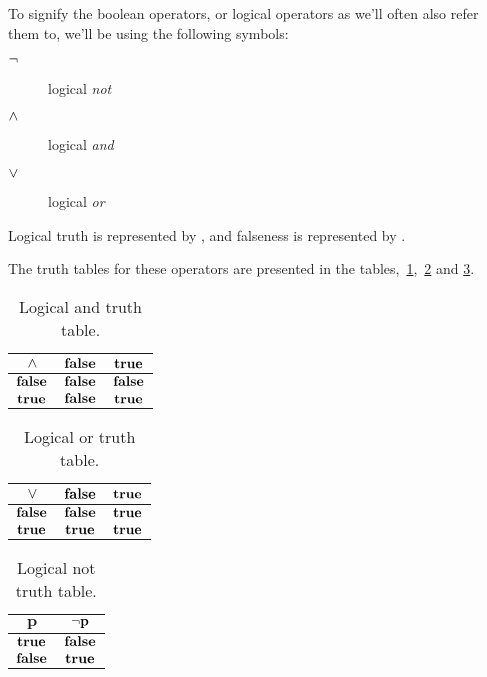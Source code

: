 To signify the boolean operators, or logical operators as we'll often
also refer them to, we'll be using the following symbols:

\begin{description}
\item[$\neg$] logical \textit{not}
\item[$\wedge$] logical \textit{and}
\item[$\vee$] logical \textit{or}
\end{description}

Logical truth is represented by \True, and falseness is represented by
\False.

The truth tables for these operators are presented in the
tables,~\ref{tab:log-and-table},~\ref{tab:log-or-table} and
\ref{tab:log-not-table}.

\begin{table}
  \centering
  \begin{tabular}{|c|c|c|}
    \hline
    $\mathbf{\wedge}$ & $\mathbf{\textbf{false}}$ & $\mathbf{\textbf{true}}$ \\ \hline
    $\mathbf{\textbf{false}}$ & $\mathbf{\textbf{false}}$ & $\mathbf{\textbf{false}}$ \\ \hline
    $\mathbf{\textbf{true}}$ & $\mathbf{\textbf{false}}$ & $\mathbf{\textbf{true}}$ \\ \hline
  \end{tabular}
  \caption{Logical and truth table.}
  \label{tab:log-and-table}
\end{table}

\begin{table}
  \centering
  \begin{tabular}{|c|c|c|}
    \hline
    $\mathbf{\vee}$ & $\mathbf{\textbf{false}}$ & $\mathbf{\textbf{true}}$ \\ \hline
    $\mathbf{\textbf{false}}$ & $\textbf{false}$ & $\textbf{true}$ \\ \hline
    $\mathbf{\textbf{true}}$ & $\textbf{true}$ & $\textbf{true}$ \\ \hline
  \end{tabular}
  \caption{Logical or truth table.}
  \label{tab:log-or-table}
\end{table}

\begin{table}
  \centering
  \begin{tabular}{|c|c|}
    \hline
    $\mathbf{p}$ & $\mathbf{\neg p}$ \\ \hline
    $\textbf{true}$ & $\textbf{false}$ \\ \hline
    $\textbf{false}$ & $\textbf{true}$ \\ \hline
  \end{tabular}
  \caption{Logical not truth table.}
  \label{tab:log-not-table}
\end{table}

